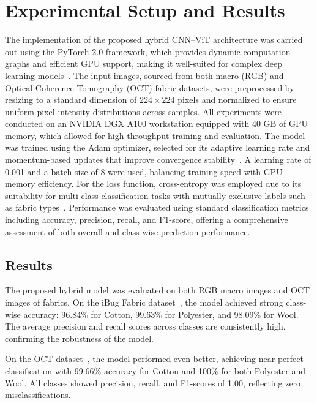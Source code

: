 \section{Experimental Setup and Results}

The implementation of the proposed hybrid CNN–ViT architecture was carried out using the PyTorch 2.0 framework, which provides dynamic computation graphs and efficient GPU support, making it well-suited for complex deep learning models~\cite{paszke2019pytorch}. The input images, sourced from both macro (RGB) and Optical Coherence Tomography (OCT) fabric datasets, were preprocessed by resizing to a standard dimension of $224 \times 224$ pixels and normalized to ensure uniform pixel intensity distributions across samples. All experiments were conducted on an NVIDIA DGX A100 workstation equipped with 40 GB of GPU memory, which allowed for high-throughput training and evaluation. The model was trained using the Adam optimizer, selected for its adaptive learning rate and momentum-based updates that improve convergence stability~\cite{kingma2014adam}. A learning rate of 0.001 and a batch size of 8 were used, balancing training speed with GPU memory efficiency. For the loss function, cross-entropy was employed due to its suitability for multi-class classification tasks with mutually exclusive labels such as fabric types~\cite{goodfellow2016deep}. Performance was evaluated using standard classification metrics including accuracy, precision, recall, and F1-score, offering a comprehensive assessment of both overall and class-wise prediction performance.

\subsection{Results}

The proposed hybrid model was evaluated on both RGB macro images and OCT images of fabrics. On the iBug Fabric dataset~\cite{researchgate}, the model achieved strong class-wise accuracy: 96.84\% for Cotton, 99.63\% for Polyester, and 98.09\% for Wool. The average precision and recall scores across classes are consistently high, confirming the robustness of the model.

On the OCT dataset~\cite{kampouris2016fine}, the model performed even better, achieving near-perfect classification with 99.66\% accuracy for Cotton and 100\% for both Polyester and Wool. All classes showed precision, recall, and F1-scores of 1.00, reflecting zero misclassifications.

